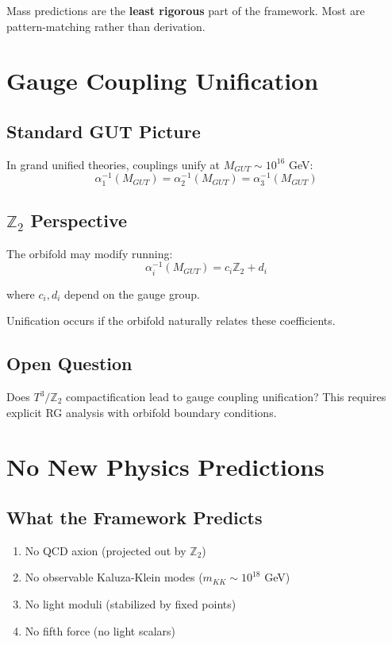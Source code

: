 \documentclass[12pt,a4paper]{article}
\begin{document}
Mass predictions are the \textbf{least rigorous} part of the framework. Most are pattern-matching rather than derivation.

\section{Gauge Coupling Unification}

\subsection{Standard GUT Picture}

In grand unified theories, couplings unify at $M_{GUT} \sim 10^{16}$ GeV:
\begin{equation}
\alpha_1^{-1}(M_{GUT}) = \alpha_2^{-1}(M_{GUT}) = \alpha_3^{-1}(M_{GUT})
\end{equation}

\subsection{$\mathbb{Z}_2$ Perspective}

The orbifold may modify running:
\begin{equation}
\alpha_i^{-1}(M_{GUT}) = c_i \mathbb{Z}_2 + d_i
\end{equation}

where $c_i, d_i$ depend on the gauge group.

Unification occurs if the orbifold naturally relates these coefficients.

\subsection{Open Question}

Does $T^3/\mathbb{Z}_2$ compactification lead to gauge coupling unification? This requires explicit RG analysis with orbifold boundary conditions.

\section{No New Physics Predictions}

\subsection{What the Framework Predicts}

\begin{enumerate}
    \item No QCD axion (projected out by $\mathbb{Z}_2$)
    \item No observable Kaluza-Klein modes ($m_{KK} \sim 10^{18}$ GeV)
    \item No light moduli (stabilized by fixed points)
    \item No fifth force (no light scalars)
\end{enumerate}
\end{document}
